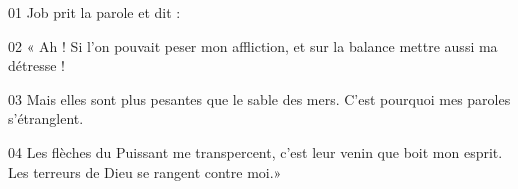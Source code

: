 01 Job prit la parole et dit :

02 « Ah ! Si l’on pouvait peser mon affliction, et sur la balance mettre aussi ma détresse !

03 Mais elles sont plus pesantes que le sable des mers. C’est pourquoi mes paroles s’étranglent.

04 Les flèches du Puissant me transpercent, c’est leur venin que boit mon esprit. Les terreurs de Dieu se rangent contre moi.»
